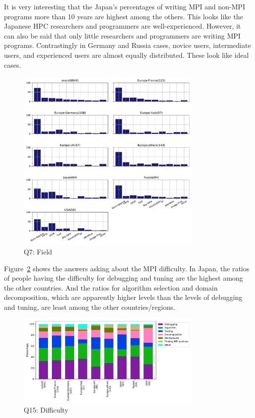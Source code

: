 \documentclass[submit,techrep,noauthor,english]{ipsj}
\begin{document}
It is very interesting that the Japan's percentages of writing MPI and
non-MPI programs more than 10 years are highest among the
others. This looks like the Japanese HPC researchers and programmers
are well-experienced. However, it can also be said that only little
researchers and programmers are writing MPI programs. Contrastingly
in Germany and Russia cases, novice users, intermediate users, and
experienced users are almost equally distributed.  These look like
ideal cases. 

\begin{figure}[htb]
\begin{center}
\includegraphics[width=9cm]{../pdfs/Q7.pdf}
  \vspace{-8mm}
\caption{Q7: Field}
\label{fig:q7}
\end{center}
\end{figure}

Figure~\ref{fig:q15} shows the answers asking about the MPI
difficulty. In Japan, the ratios of people having the difficulty for
debugging and tuning are the highest among the other countries. And
the ratios for algorithm selection and domain decomposition, which
are apparently higher levels than the levels of debugging and tuning,
are least among the other countries/regions.

\begin{figure}[htb]
\begin{center}
\includegraphics[width=9cm]{../pdfs/Q15.pdf}
  \vspace{-8mm}
\caption{Q15: Difficulty}
\label{fig:q15}
\end{center}
\end{figure}
\end{document}

